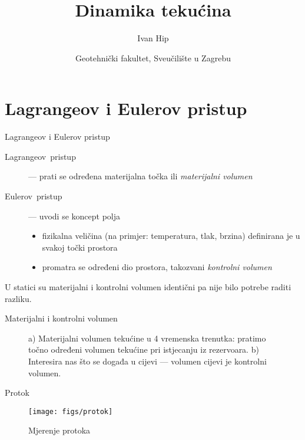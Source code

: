 \documentclass[croatian]{beamer}
\begin{document}
\title{Dinamika tekućina}
\author{Ivan Hip}
\date{Geotehnički fakultet, Sveučilište u Zagrebu}

\begin{frame}
\titlepage
\end{frame}

\section{Lagrangeov i Eulerov pristup}

\begin{frame}{Lagrangeov i Eulerov pristup}

\begin{description}
\item [{Lagrangeov~pristup}] --- prati se određena materijalna točka
ili \emph{materijalni volumen}
\item [{Eulerov~pristup}] --- uvodi se koncept polja

\begin{itemize}
\item fizikalna veličina (na primjer: temperatura, tlak, brzina) definirana
je u svakoj točki prostora
\item promatra se određeni dio prostora, takozvani \emph{kontrolni volumen}
\end{itemize}

\end{description}
U statici su materijalni i kontrolni volumen identični pa nije bilo
potrebe raditi razliku.
\end{frame}

\begin{frame}{Materijalni i kontrolni volumen}

\begin{figure}
\begin{centering}
\par\end{centering}
\caption{a) Materijalni volumen tekućine u 4 vremenska trenutka: pratimo točno
određeni volumen tekućine pri istjecanju iz rezervoara. b) Interesira
nas što se događa u cijevi --- volumen cijevi je kontrolni volumen.}
\end{figure}
\end{frame}

\begin{frame}{Protok}

\begin{figure}
\texttt{[image: figs/protok]}\caption{Mjerenje protoka}
\end{figure}
\end{frame}
\end{document}
